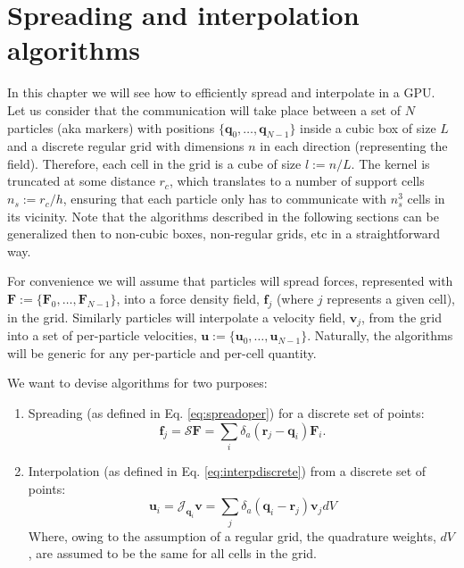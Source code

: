 \documentclass[ twoside,openright,titlepage,numbers=noenddot,%
headinclude,footinclude,cleardoublepage=empty,abstract=on,
BCOR=5mm,paper=b5,fontsize=11pt, dvipsnames
]{scrreprt}
\renewcommand{\vec}[1]{\bm{#1}}
\newcommand{\oper}[1]{\mathcal{#1}}
\newcommand{\gpu}{\gls{GPU}\xspace}
\newcommand{\ppos}{q}
\newcommand{\pvel}{u}
\newcommand{\fpos}{r}
\newcommand{\fvel}{v}
\begin{document}
\section{Spreading and interpolation algorithms}
In this chapter we will see how to efficiently spread and interpolate in a \gpu.
Let us consider that the communication will take place between a set of $N$ particles (aka markers) with positions $\{\vec{\ppos}_0,\dots,\vec{\ppos}_{N-1}\}$ inside a cubic box of size $L$ and a discrete regular grid with dimensions $n$ in each direction (representing the field). Therefore, each cell in the grid is a cube of size $l := n/L$. The kernel is truncated at some distance $r_c$, which translates to a number of support cells $n_s:=r_c/h$, ensuring that each particle only has to communicate with $n_s^3$ cells in its vicinity. Note that the algorithms described in the following sections can be generalized then to non-cubic boxes, non-regular grids, etc in a straightforward way.

For convenience we will assume that particles will spread forces, represented with $\vec{F}:=\{\vec{F}_0,\dots,\vec{F}_{N-1}\}$, into a force density field, $\vec{f}_j$ (where $j$ represents a given cell), in the grid. Similarly particles will interpolate a velocity field, $\vec{\fvel}_j$, from the grid into a set of per-particle velocities, $\vec{\pvel}:=\{\vec{\pvel}_0,\dots,\vec{\pvel}_{N-1}\}$. Naturally, the algorithms will be generic for any per-particle and per-cell quantity.

We want to devise algorithms for two purposes:
\begin{enumerate}
\item Spreading (as defined in Eq. \eqref{eq:spreadoper}) for a discrete set of points:
  \begin{equation}
    \vec{f}_j = \oper{S}\vec{F} = \sum_i \delta_a(\vec{\fpos}_j-\vec{\ppos}_i) \vec{F}_i.
  \end{equation}
\item Interpolation (as defined in Eq. \eqref{eq:interpdiscrete}) from a discrete set of points:
  \begin{equation}
    \label{eq:interpdiscrete}
    \vec{u}_i = \oper{J}_{\vec{\ppos}_i}\vec{\fvel} = \sum_j{\delta_a(\vec{\ppos}_i - \vec{\fpos}_j)\vec{\fvel}_jdV}
  \end{equation}
  Where, owing to the assumption of a regular grid, the quadrature weights, $dV$, are assumed to be the same for all cells in the grid.
\end{enumerate}
\end{document}
